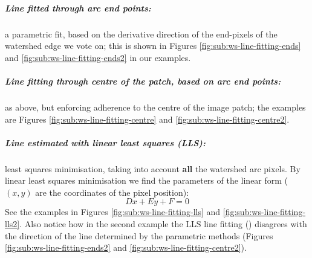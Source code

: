 \subparagraph{Line fitted through arc {\bf end points}:}
\label{par:ch4-line-ends}
a parametric fit, based on the derivative direction of the end-pixels of the watershed edge we vote on; this is shown in Figures \ref{fig:sub:ws-line-fitting-ends} and \ref{fig:sub:ws-line-fitting-ends2} in our examples.

\subparagraph{Line fitting through {\bf centre} of the patch, based on arc end points:} 
\label{par:ch4-line-centre}
as above, but enforcing adherence to the centre of the image patch; the examples are Figures  \ref{fig:sub:ws-line-fitting-centre} and \ref{fig:sub:ws-line-fitting-centre2}.

\subparagraph{Line estimated with {\bf linear least squares (LLS)}:} 
\label{par:ch4-line-fitting-lls}
least squares minimisation, taking into account \textbf{all} the watershed arc pixels. By linear least squares minimisation we find the parameters of the linear form ($(x,y)$ are the coordinates of the pixel position):
\begin{equation}
 Dx+Ey+F=0
\end{equation}
See the examples in Figures \ref{fig:sub:ws-line-fitting-lls} and \ref{fig:sub:ws-line-fitting-lls2}. Also notice how in the second example  %
the LLS line fitting () disagrees with the direction of the line determined by the parametric methods (Figures \ref{fig:sub:ws-line-fitting-ends2} and \ref{fig:sub:ws-line-fitting-centre2}).


